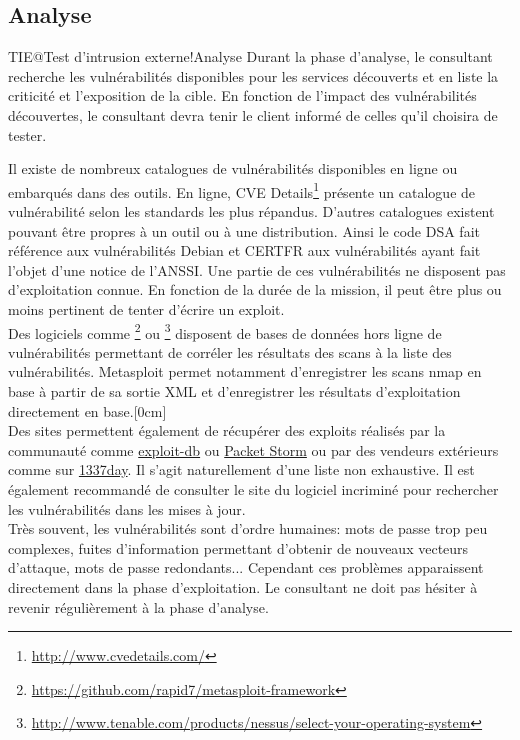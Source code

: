 \documentclass[twoside,a4paper,12pt,titlepage]{book}
\newcommand{\MarginPar}[2]{\marginnote{\scriptsize #1}[#2]}
\begin{document}
\subsection{Analyse}
\begin{Define}{TIE@Test d'intrusion externe!Analyse}
	Durant la phase d'analyse, le consultant recherche les vulnérabilités disponibles pour les services découverts et en liste la criticité et l'exposition de la cible. En fonction de l'impact des vulnérabilités découvertes, le consultant devra tenir le client informé de celles qu'il choisira de tester.
\end{Define}
Il existe de nombreux catalogues de vulnérabilités disponibles en ligne ou embarqués dans des outils. En ligne, CVE Details\footnote{\url{http://www.cvedetails.com/}} présente un catalogue de vulnérabilité selon les standards les plus répandus. D'autres catalogues existent pouvant être propres à un outil ou à une distribution. Ainsi le code DSA fait référence aux vulnérabilités Debian et CERTFR aux vulnérabilités ayant fait l'objet d'une notice de l'ANSSI. Une partie de ces vulnérabilités ne disposent pas d'exploitation connue. En fonction de la durée de la mission, il peut être plus ou moins pertinent de tenter d'écrire un exploit.\\
Des logiciels comme \footnote{\url{https://github.com/rapid7/metasploit-framework}} ou \footnote{\url{http://www.tenable.com/products/nessus/select-your-operating-system}} disposent de bases de données hors ligne de vulnérabilités permettant de corréler les résultats des scans à la liste des vulnérabilités. Metasploit permet notamment d'enregistrer les scans nmap en base à partir de sa sortie XML et d'enregistrer les résultats d'exploitation directement en base.\MarginPar{\textbf{Recherche de vulnérabilités}}{0cm}\\
	Des sites permettent également de récupérer des exploits réalisés par la communauté comme \href{https://www.exploit-db.com/}{exploit-db} ou \href{https://packetstormsecurity.com/}{Packet Storm} ou par des vendeurs extérieurs comme sur \href{1337day.com}{1337day}. Il s'agit naturellement d'une liste non exhaustive. Il est également recommandé de consulter le site du logiciel incriminé pour rechercher les vulnérabilités dans les mises à jour. \\
	Très souvent, les vulnérabilités sont d'ordre humaines: mots de passe trop peu complexes, fuites d'information permettant d'obtenir de nouveaux vecteurs d'attaque, mots de passe redondants... Cependant ces problèmes apparaissent directement dans la phase d'exploitation. Le consultant ne doit pas hésiter à revenir régulièrement à la phase d'analyse.
\end{document}
